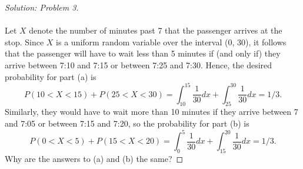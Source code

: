 \documentclass[10pt]{article}
\begin{document}
\vspace{0.2cm}
\begin{proof}[Solution: Problem 3]
\text{}\\
\text{}\\
Let $X$ denote the number of minutes past 7 that the passenger arrives at the stop. Since $X$ is a uniform random variable over the interval (0, 30), it follows that the passenger will have to wait less than 5 minutes if (and only if) they arrive between 7:10 and 7:15 or between 7:25 and 7:30. Hence, the desired probability for part (a) is
\begin{equation*}
P(10 < X < 15) + P(25 < X < 30) = \int_{10}^{15}\frac{1}{30}dx + \int_{25}^{30}\frac{1}{30}dx = 1/3.
\end{equation*}
Similarly, they would have to wait more than 10 minutes if they arrive between 7 and 7:05 or between 7:15 and 7:20, so the probability for part (b) is
\begin{equation*}
P(0 < X < 5) + P(15 < X < 20) = \int_{0}^{5}\frac{1}{30}dx + \int_{15}^{20}\frac{1}{30}dx = 1/3.
\end{equation*}
Why are the answers to (a) and (b) the same?
\end{proof}
\end{document}
